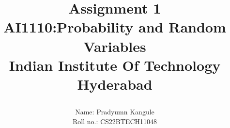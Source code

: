 \documentclass[journal,12pt]{IEEEtran}
\begin{document}
\let\vec\mathbf




\vspace{3cm}

\title{
 \textbf{Assignment 1}\\
 \large \textbf{AI1110}:Probability and Random Variables\\\large Indian Institute Of Technology Hyderabad
 
 
}
\author{ Name: Pradyumn Kangule \\
         Roll no.: CS22BTECH11048 \\
	
}	


%
%
%

% 
%
\end{document}

